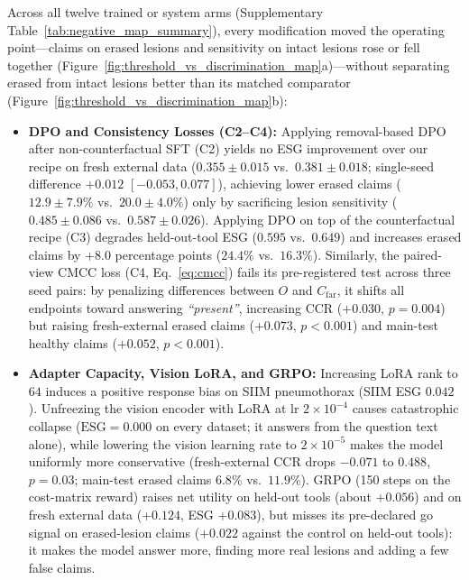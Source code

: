 \documentclass[journal]{IEEEtran}
\begin{document}
Across all twelve trained or system arms (Supplementary Table~\ref{tab:negative_map_summary}), every modification moved the operating point---claims on erased lesions and sensitivity on intact lesions rose or fell together (Figure~\ref{fig:threshold_vs_discrimination_map}a)---without separating erased from intact lesions better than its matched comparator (Figure~\ref{fig:threshold_vs_discrimination_map}b):
\begin{itemize}[leftmargin=*,nosep]
    \item \textbf{DPO and Consistency Losses (C2--C4):} Applying removal-based DPO after non-counterfactual SFT (C2) yields no ESG improvement over our recipe on fresh external data ($0.355 \pm 0.015$ vs.\ $0.381 \pm 0.018$; single-seed difference $+0.012$ $[-0.053, 0.077]$), achieving lower erased claims ($12.9 \pm 7.9\%$ vs.\ $20.0 \pm 4.0\%$) only by sacrificing lesion sensitivity ($0.485 \pm 0.086$ vs.\ $0.587 \pm 0.026$). Applying DPO on top of the counterfactual recipe (C3) degrades held-out-tool ESG ($0.595$ vs.\ $0.649$) and increases erased claims by $+8.0$ percentage points ($24.4\%$ vs.\ $16.3\%$). Similarly, the paired-view CMCC loss (C4, Eq.~\ref{eq:cmcc}) fails its pre-registered test across three seed pairs: by penalizing differences between $O$ and $C_{\text{far}}$, it shifts all endpoints toward answering \emph{``present''}, increasing CCR ($+0.030$, $p=0.004$) but raising fresh-external erased claims ($+0.073$, $p<0.001$) and main-test healthy claims ($+0.052$, $p<0.001$).
    \item \textbf{Adapter Capacity, Vision LoRA, and GRPO:} Increasing LoRA rank to $64$ induces a positive response bias on SIIM pneumothorax (SIIM ESG $0.042$). Unfreezing the vision encoder with LoRA at $\text{lr } 2\times 10^{-4}$ causes catastrophic collapse ($\text{ESG} = 0.000$ on every dataset; it answers from the question text alone), while lowering the vision learning rate to $2\times 10^{-5}$ makes the model uniformly more conservative (fresh-external CCR drops $-0.071$ to $0.488$, $p=0.03$; main-test erased claims $6.8\%$ vs.\ $11.9\%$). GRPO (150 steps on the cost-matrix reward) raises net utility on held-out tools (about $+0.056$) and on fresh external data ($+0.124$, ESG $+0.083$), but misses its pre-declared go signal on erased-lesion claims ($+0.022$ against the control on held-out tools): it makes the model answer more, finding more real lesions and adding a few false claims.

\end{itemize}
\end{document}
